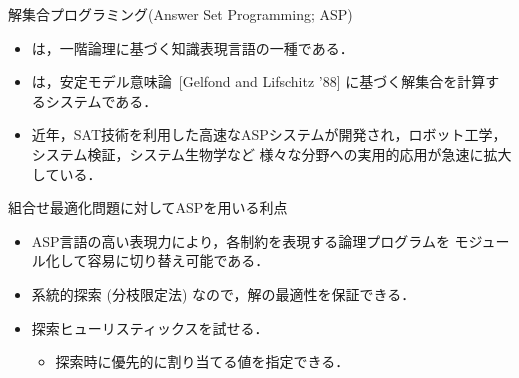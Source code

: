 \documentclass[11pt,dvipdfmx]{beamer}
\begin{document}
\begin{frame}{解集合プログラミング(Answer Set Programming; ASP)}
  \begin{itemize}
  \item {}は，一階論理に基づく知識表現言語の一種である．
  \item {}は，安定モデル意味論~[Gelfond and Lifschitz '88]
    に基づく解集合を計算するシステムである．
  \item 近年，SAT技術を利用した高速なASPシステムが開発され，ロボット工学，
    システム検証，システム生物学など
    様々な分野への実用的応用が急速に拡大している．
  \end{itemize}
  \begin{exampleblock}{組合せ最適化問題に対してASPを用いる利点}
    \begin{itemize}
    \item ASP言語の高い表現力により，各制約を表現する論理プログラムを
      モジュール化して容易に切り替え可能である．
    \item 系統的探索 (分枝限定法) なので，解の最適性を保証できる．
    \item 探索ヒューリスティックスを試せる．
      \begin{itemize}
      \item 探索時に優先的に割り当てる値を指定できる．
      \end{itemize}
    \end{itemize}
  \end{exampleblock}
\end{frame}
\end{document}
